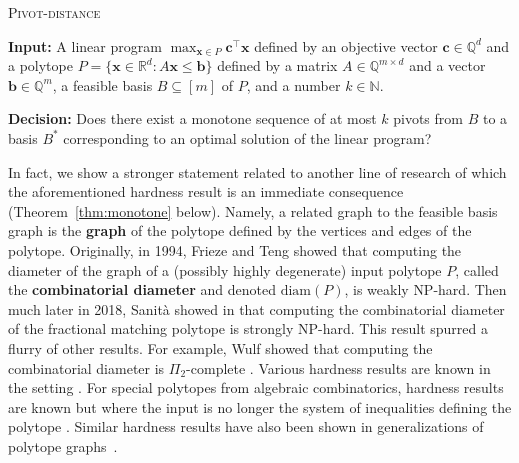 \documentclass[centering,11pt,reqno]{amsart}
\theoremstyle{definition}
\newcommand{\NP}{\textsc{NP}}
\begin{document}
\begin{mdframed}[innerleftmargin=0.5em, innertopmargin=0.5em, innerrightmargin=0.5em, innerbottommargin=0.5em, userdefinedwidth=0.95\linewidth, align=center]
	{\textsc{Pivot-distance}}
	\sloppy

	\noindent
	\textbf{Input:} A linear program $\max_{\mathbf{x}\in P}\mathbf{c}^{\intercal} \mathbf{x}$ defined by an objective vector $\mathbf{c} \in \mathbb{Q}^{d}$ and a polytope $P = \{\mathbf{x}\in \mathbb{R}^d\colon A\mathbf{x}\leq \mathbf{b}\}$ defined by a matrix $A\in \mathbb{Q}^{m\times d}$ and a vector $\mathbf{b}\in \mathbb{Q}^m$, a feasible basis $B \subseteq [m]$ of $P$, and a number $k\in \mathbb{N}$. 

	\noindent
    \textbf{Decision:} Does there exist a monotone sequence of at most $k$ pivots from $B$ to a basis $B^{\ast}$ corresponding to an optimal solution of the linear program?
\end{mdframed}

In fact, we show a stronger statement related to another line of research of which the aforementioned hardness result is an immediate consequence (Theorem~\ref{thm:monotone} below). Namely, a related graph to the feasible basis graph is the \textbf{graph} of the polytope defined by the vertices and edges of the polytope. Originally, in 1994, Frieze and Teng showed \cite{FriezeTeng1994} that computing the diameter of the graph of a (possibly highly degenerate) input polytope $P$, called the \textbf{combinatorial diameter} and denoted $\mathrm{diam}(P)$, is weakly \NP-hard. Then much later in 2018, Sanit\`{a} showed in \cite{Sanita18} that computing the combinatorial diameter of the fractional matching polytope is strongly \NP-hard. This result spurred a flurry of other results. For example, Wulf showed that computing the combinatorial diameter is $\Pi_{2}$-complete \cite{HarderthanNPHard}. Various hardness results are known in the setting \cite{MonotoneDiameterHard, PolymatroidsPathHard, CircuitPivotRules, ShortestPathNoConstantFactor}. For special polytopes from algebraic combinatorics, hardness results are known but where the input is no longer the system of inequalities defining the polytope \cite{GraphicalZonotopes, ReconfigAlternatingCycles}. Similar hardness results have also been shown in generalizations of polytope graphs~\cite{CircuitPivotRules, fixeddimcircs,SigncompCircuitHard}. 
\end{document}
